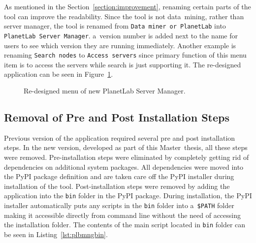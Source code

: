 {{{{As mentioned in the Section~\ref{section:improvement}, renaming certain parts of the tool can improve the readability. Since the tool is not data~mining, rather than server manager, the tool is renamed from \texttt{Data~miner or PlanetLab} into \texttt{PlanetLab Server Manager}. a~version number is added next to the name for users to see which version they are running immediately. Another example is renaming \texttt{Search nodes} to \texttt{Access servers} since primary function of this menu item is to access the servers while search is just supporting it. The re-designed application can be seen in Figure~\ref{fig:redesigned}.\\

\begin{figure}[H]
	\centering
	\caption{Re-designed menu of new PlanetLab Server Manager.}
	\label{fig:redesigned}
\end{figure}

\subsection{Removal of Pre and Post Installation Steps}
Previous version of the application required several pre and post installation steps. In the new version, developed as part of this Master~thesis, all these steps were removed. Pre-installation steps were eliminated by completely getting rid of dependencies on additional system packages. All dependencies were moved into the PyPI package definition and are taken care off the PyPI installer during installation of the tool. Post-installation steps were removed by adding the application into the \texttt{bin} folder in the PyPI package. During installation, the PyPI installer automatically puts any scripts in the \texttt{bin} folder into a~\texttt{\$PATH} folder making it accessible directly from command line without the need of accessing the installation folder. The contents of the main script located in \texttt{bin} folder can be seen in Listing~\ref{lst:plbmngbin}.

}}}}
